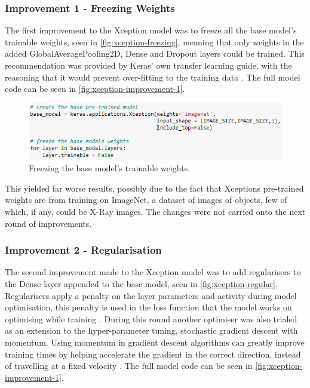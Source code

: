 \subsubsection{Improvement 1 - Freezing Weights}
The first improvement to the Xception model was to freeze all the base model's trainable weights, seen in \autoref{fig:xception-freezing}, meaning that only weights in the added GlobalAveragePooling2D, Dense and Dropout layers could be trained. This recommendation was provided by Keras' own transfer learning guide, with the reasoning that it would prevent over-fitting to the training data \citep{Transfer59:online}. The full model code can be seen in \autoref{fig:xception-improvement-1}.

\begin{figure}[H]
    \centering
    \includegraphics[width=\textwidth]{figures/xception-freezing.png}
    \caption{Freezing the base model's trainable weights.}
    \label{fig:xception-freezing}
\end{figure}

This yielded far worse results, possibly due to the fact that Xceptions pre-trained weights are from training on ImageNet, a dataset of images of objects, few of which, if any, could be X-Ray images. The changes were not carried onto the next round of improvements.

\subsubsection{Improvement 2 - Regularisation}
The second improvement made to the Xception model was to add regularisers to the Dense layer appended to the base model, seen in \autoref{fig:xception-regular}. Regularisers apply a penalty on the layer parameters and activity during model optimisation, this penalty is used in the loss function that the model works on optimising while training \citep{Layerwei14:online}. During this round another optimiser was also trialed as an extension to the hyper-parameter tuning, stochastic gradient descent with momentum. Using momentum in gradient descent algorithms can greatly improve training times by helping accelerate the gradient in the correct direction, instead of travelling at a fixed velocity \citep{qian1999momentum}. The full model code can be seen in \autoref{fig:xception-improvement-1}.

